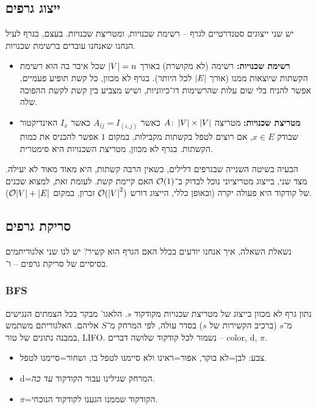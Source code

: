 \documentclass[]{../../../../tex/classes/styledArticle}
\begin{document}
	\subsection{ייצוג גרפים}
	יש שני ייצוגים סטנדרטיים לגרף – רשימת שכנויות, ומטריצת שכנויות. בעצם, בגרף לעיל הנחנו שאנחנו עובדים ברשימת שכנויות. 
	\begin{itemize}
		\item \textbf{רשימת שכנויות: }רשימה (לא מקושרת) באורך $\left \lvert V \right \rvert = n$ שכל איבר בה הוא רשימת הקשתות שיוצאות ממנו (אורך $\left \lvert E \right \rvert$ לכל היותר). בגרף לא מכוון, כל קשת תופיע פעמיים. אפשר להניח בלי שום עלות שהרשימות דו־כיווניות, ושיש מצביע בין קשת לקשת ההפוכה שלה. 
		\item \textbf{מטריצת שכנויות: }מטריצה $A \colon \left \lvert V \right \rvert \times \left \lvert V \right \rvert$ כאשר $A_{ij} = I_{(i, j)}$ כאשר $I_x$ האינדיקטור שבודק $x \in E$, אם רוצים לטפל בקשתות מקבילות, במקום $1$ אפשר להכניס את כמות הקשתות. בגרף לא מכוון, מטריצת השכנויות היא סימטרית. 
	\end{itemize}
	הבעיה בשיטה השנייה שבגרפים דלילים, כשאין הרבה קשתות, היא מאוד מאוד לא יעילה. מצד שני, בייצוג מטריציוני נוכל לבדוק ב־$\mathcal{O}(1)$ האם קיימת קשת. לעומת זאת, למצוא שכנים של קודקוד היא פעולה יקרה (ובאופן כללי, הייצוג דורש $\mathcal{O}(\left \lvert V \right \rvert^{2})$ זכרון, במקום $\mathcal{O}{\left \lvert V \right \rvert + \left \lvert E \right \rvert}$). 
	
	\subsection{סריקת גרפים}
	נשאלת השאלה, איך אנחנו יודעים בכלל האם הגרף הוא קשיר? יש לנו שני אלגוריתמים בסיסיים של סריקת גרפים –  ו־. 
	\subsubsection{BFS}
	נתון גרף לא מכוון בייצוג של מטריצת שכנויות מקודקוד $s$. הלאגו' מבקר בכל הצמתים הנגישים מ־$s$ (ברכיב הקשירות של $s$) בסדר עולה, לפי המרחק מ־$S$ אליהם. האלגוריתם משתמש במבנה נתונים של טור, LIFO. נשמור לכל קודקוד שלושה דברים – color, d, $\pi$. 
	\begin{itemize}
		\item צבע: לבן=לא בוקר, אפור=ראינו ולא סיימנו לטפל בו, ושחור=סיימנו לטפל. 
		\item d=המרחק שגילינו עבור הקודקוד \textit{עד כה}. 
		\item $\pi$=הקודקוד שממנו הגענו לקודקוד הנוכחי. 
	\end{itemize}
	
\end{document}
